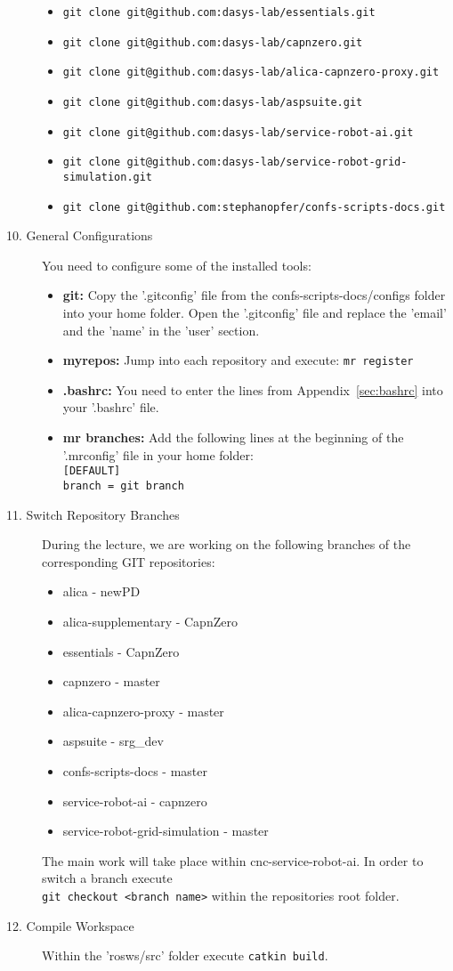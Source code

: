 \begin{description}
\begin{itemize}
		\item \verb#git clone git@github.com:dasys-lab/essentials.git#
		\item \verb#git clone git@github.com:dasys-lab/capnzero.git#
		\item \verb#git clone git@github.com:dasys-lab/alica-capnzero-proxy.git#
		\item \verb#git clone git@github.com:dasys-lab/aspsuite.git#
		\item \verb#git clone git@github.com:dasys-lab/service-robot-ai.git#
		\item \verb#git clone git@github.com:dasys-lab/service-robot-grid-simulation.git#
		\item \verb#git clone git@github.com:stephanopfer/confs-scripts-docs.git#
	\end{itemize}
	\item[10. General Configurations] You need to configure some of the installed tools:
		\begin{itemize}
			\item \textbf{git:} Copy the '.gitconfig' file from the confs-scripts-docs/configs folder into your home folder. Open the '.gitconfig' file and replace the 'email' and the 'name' in the 'user' section.
			\item \textbf{myrepos:} Jump into each repository and execute: \verb#mr register#
			\item \textbf{.bashrc:} You need to enter the lines from Appendix~\ref{sec:bashrc} into your '.bashrc' file.
			\item \textbf{mr branches:} Add the following lines at the beginning of the '.mrconfig' file in your home folder:\\
			\verb#[DEFAULT]#\\
			\verb#branch = git branch#
		\end{itemize}
	\item[11. Switch Repository Branches] During the lecture, we are working on the following branches of the corresponding GIT repositories:
	\begin{itemize}
		\item alica - newPD
		\item alica-supplementary - CapnZero
		\item essentials - CapnZero
		\item capnzero - master
		\item alica-capnzero-proxy - master		
		\item aspsuite - srg\_dev
		\item confs-scripts-docs - master
		\item service-robot-ai - capnzero
		\item service-robot-grid-simulation - master
	\end{itemize}
	The main work will take place within cnc-service-robot-ai. In order to switch a branch execute\\\verb#git checkout <branch name># within the repositories root folder.
	\item[12. Compile Workspace] Within the 'rosws/src' folder execute \verb#catkin build#.
\end{description}

